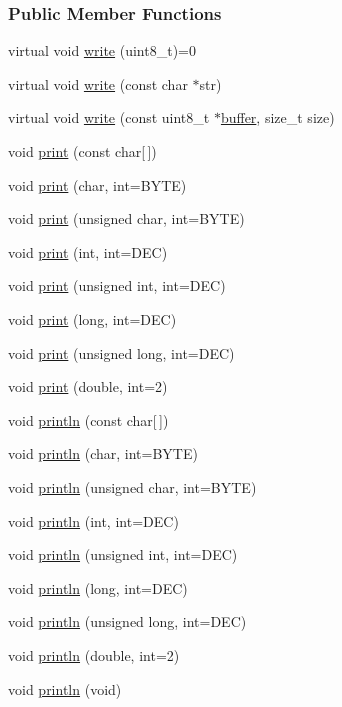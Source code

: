 \subsubsection*{Public Member Functions}
\begin{DoxyCompactItemize}
\item 
virtual void \hyperlink{class_print_ad9393033793cfc17f3e37202ba244892}{write} (uint8\_\-t)=0
\item 
virtual void \hyperlink{class_print_ae083258d224bae2e5d8a27a4f8338880}{write} (const char $\ast$str)
\item 
virtual void \hyperlink{class_print_a03094428e21f210e59cc1be63353225d}{write} (const uint8\_\-t $\ast$\hyperlink{_i_m_u_manager_8cpp_a858e0513a46bec1d794f9487c41a969d}{buffer}, size\_\-t size)
\item 
void \hyperlink{class_print_aa7b0a6dc63e3d27effd8459e3d443b83}{print} (const char\mbox{[}$\,$\mbox{]})
\item 
void \hyperlink{class_print_ada24638921c2e86e13c5939c94cf67db}{print} (char, int=BYTE)
\item 
void \hyperlink{class_print_ad7778084a6fe96551d2ec9ce532c5164}{print} (unsigned char, int=BYTE)
\item 
void \hyperlink{class_print_a35a6196999c85e5afc5fd852d088e886}{print} (int, int=DEC)
\item 
void \hyperlink{class_print_a5f8df5d4f941b411ce9d660b48996bea}{print} (unsigned int, int=DEC)
\item 
void \hyperlink{class_print_afab3f8d07a58a8d37fec32d7fcb67b56}{print} (long, int=DEC)
\item 
void \hyperlink{class_print_a4be58e920bdddcaf5496d0ba2ae4ea81}{print} (unsigned long, int=DEC)
\item 
void \hyperlink{class_print_aa5fe80d3a3e8d2dc64f346eb08dcb43f}{print} (double, int=2)
\item 
void \hyperlink{class_print_a09db74a8d51c6b2420c478267f958a51}{println} (const char\mbox{[}$\,$\mbox{]})
\item 
void \hyperlink{class_print_a49bbefc9016ddda486edf3dddaaa07e9}{println} (char, int=BYTE)
\item 
void \hyperlink{class_print_a4eaaf09c278a5927ba2ddcffb6b01e64}{println} (unsigned char, int=BYTE)
\item 
void \hyperlink{class_print_a350bdfe3569acb05a2fdefb7c54e292d}{println} (int, int=DEC)
\item 
void \hyperlink{class_print_af0aeb581689c6e9c9f8331b342a91e20}{println} (unsigned int, int=DEC)
\item 
void \hyperlink{class_print_a1999020b07369721caa16c52fdba4341}{println} (long, int=DEC)
\item 
void \hyperlink{class_print_aacf64fb9630526fb6c666f038a9dc4e6}{println} (unsigned long, int=DEC)
\item 
void \hyperlink{class_print_a4302b58946b9355b0491118227beed07}{println} (double, int=2)
\item 
void \hyperlink{class_print_a525b37c566658ff8113a067f6e8d5bf1}{println} (void)
\end{DoxyCompactItemize}
